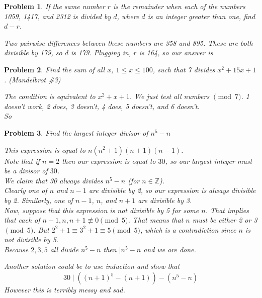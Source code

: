 \documentclass{scrartcl}
\newtheorem{a_problem}{Problem}
\begin{document}
\begin{a_problem}
	If the same number $r$ is the remainder when each of the numbers 1059, 1417, and 2312 is divided by $d$, where $d$ is an integer greater than one, find $d-r$.
	\begin{soln}
		Two pairwise differences between these numbers are 358 and 895. These are both divisible by 179, so $d$ is 179. Plugging in, $r$ is 164, so our answer is 
	\end{soln}
\end{a_problem}

\begin{a_problem}
	Find the sum of all $x$, $1 \leq x \leq 100$, such that 7 divides $x^2 + 15x + 1$. (Mandelbrot \#3)
	\begin{soln}
		The condition is equivalent to $x^2 + x + 1$.
		We just test all numbers $\pmod{7}$.
		1 doesn't work, 2 does, 3 doesn't, 4 does, 5 doesn't, and 6 doesn't. \\
		So 
	\end{soln}
\end{a_problem}

\begin{a_problem}
	Find the largest integer divisor of $n^5 - n$
	\begin{soln}
		This expression is equal to $n(n^2+1)(n+1)(n-1)$. \\
		Note that if $n=2$ then our expression is equal to $30$, so our largest integer must be a divisor of $30$. \\
		We claim that 30 always divides $n^5 - n$ (for $n \in \mathbb{Z}$). \\
		Clearly one of $n$ and $n-1$ are divisible by 2, so our expression is always divisible by 2. Similarly, one of $n-1$, $n$, and $n+1$ are divisible by 3. \\
		Now, suppose that this expression is not divisible by 5 for some $n$.
		That implies that each of $n-1, n, n+1 \not\equiv 0 \pmod{5}$.
		That means that $n$ must be either 2 or 3 $\pmod{5}$.
		But $2^2 + 1 \equiv 3^2 + 1 \equiv 5 \pmod{5}$, which is a contradiction since $n$ is not divisible by 5. \\
		Because $2,3,5$ all divide $n^5 - n$ then $\mid n^5 - n$ and we are done.
	\end{soln}
	\begin{remark}
		Another solution could be to use induction and show that 
		\[30 \mid ((n+1)^5 - (n+1)) - (n^5 - n)\]
		However this is terribly messy and sad.
	\end{remark}
\end{a_problem}
\end{document}
